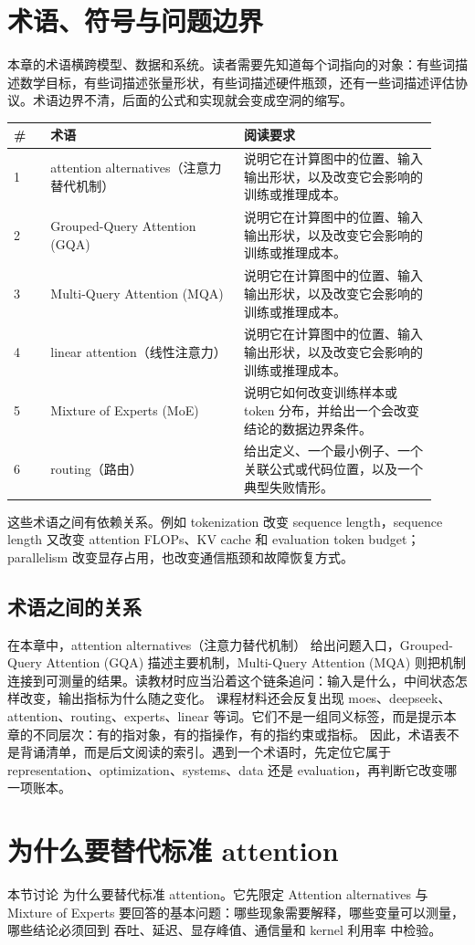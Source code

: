 \documentclass[a4paper]{article}
\begin{document}
\section{术语、符号与问题边界}
本章的术语横跨模型、数据和系统。读者需要先知道每个词指向的对象：有些词描述数学目标，有些词描述张量形状，有些词描述硬件瓶颈，还有一些词描述评估协议。术语边界不清，后面的公式和实现就会变成空洞的缩写。
\begin{longtable}{p{0.08\linewidth}p{0.42\linewidth}p{0.42\linewidth}}
\toprule
\textbf{\#} & \textbf{术语} & \textbf{阅读要求}\\
\midrule
1 & attention alternatives（注意力替代机制） & 说明它在计算图中的位置、输入输出形状，以及改变它会影响的训练或推理成本。\\
2 & Grouped-Query Attention (GQA) & 说明它在计算图中的位置、输入输出形状，以及改变它会影响的训练或推理成本。\\
3 & Multi-Query Attention (MQA) & 说明它在计算图中的位置、输入输出形状，以及改变它会影响的训练或推理成本。\\
4 & linear attention（线性注意力） & 说明它在计算图中的位置、输入输出形状，以及改变它会影响的训练或推理成本。\\
5 & Mixture of Experts (MoE) & 说明它如何改变训练样本或 token 分布，并给出一个会改变结论的数据边界条件。\\
6 & routing（路由） & 给出定义、一个最小例子、一个关联公式或代码位置，以及一个典型失败情形。\\
\bottomrule
\end{longtable}
这些术语之间有依赖关系。例如 tokenization 改变 sequence length，sequence length 又改变 attention FLOPs、KV cache 和 evaluation token budget；parallelism 改变显存占用，也改变通信瓶颈和故障恢复方式。
\subsection{术语之间的关系}
在本章中，attention alternatives（注意力替代机制） 给出问题入口，Grouped-Query Attention (GQA) 描述主要机制，Multi-Query Attention (MQA) 则把机制连接到可测量的结果。读教材时应当沿着这个链条追问：输入是什么，中间状态怎样改变，输出指标为什么随之变化。
课程材料还会反复出现 moes、deepseek、attention、routing、experts、linear 等词。它们不是一组同义标签，而是提示本章的不同层次：有的指对象，有的指操作，有的指约束或指标。
因此，术语表不是背诵清单，而是后文阅读的索引。遇到一个术语时，先定位它属于 representation、optimization、systems、data 还是 evaluation，再判断它改变哪一项账本。
\section{为什么要替代标准 attention}
本节讨论 为什么要替代标准 attention。它先限定 Attention alternatives 与 Mixture of Experts 要回答的基本问题：哪些现象需要解释，哪些变量可以测量，哪些结论必须回到 吞吐、延迟、显存峰值、通信量和 kernel 利用率 中检验。
\end{document}
